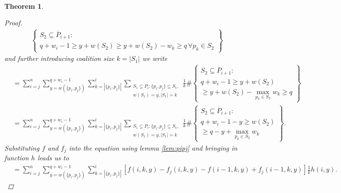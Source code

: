 \documentclass[review]{elsarticle}
\newtheorem{thm}{Theorem} %
\theoremstyle{defn}
\theoremstyle{Pseudo-Code}
\begin{document}
\begin{thm}
\begin{proof}
\begin{align*}
    \left\lbrace
    \substack{
         S_2\subseteq \overline{P}_{i+1}: 
         \\
         q+w_i-1\geq y+ w(S_2)\geq y+w(S_2)-w_k\geq q\, \forall p_k\in S_2 
     }    
    \right\rbrace
\end{align*}
and further introducing coalition size $k=|S_1|$ we write
\begin{align*}
  &=
  \sum_{i=j}^n
  \sum_{y=w(\{ p_i,p_j \})}^{q+w_i-1}
  \sum_{k=|\{ p_i,p_j \}|}^i
  \sum_{\substack{S_1\subseteq P_i: \{p_i, p_j\}\subseteq S_1, 
  \\ w(S_1)=y,|S_1|=k}}
    \frac{1}{k}
    \#\left\lbrace
      \substack{
         S_2\subseteq \overline{P}_{i+1}:
         \\
          q+w_i-1\geq y+w( S_2)
         \\          
          \geq y+w(S_2)-\max\limits_{p_k\in S_2}w_k\geq q    
      }
    \right\rbrace      
\\
  &=
  \sum_{i=j}^n
  \sum_{y=w(\{ p_i,p_j \})}^{q+w_i-1}
  \sum_{k=|\{ p_i,p_j \}|}^i
  \sum_{\substack{S_1\subseteq P_i: \{p_i, p_j\}\subseteq S_1, 
  \\ w(S_1)=y,|S_1|=k}}
    \frac{1}{k}
   \#\left\lbrace
   \substack{
       S_2\subseteq \overline{P}_{i+1}: 
       \\
       q+w_i-1-y\geq w(S_2)
       \\
       \geq q-y+\max\limits_{p_k\in S_2}w_k
    }
    \right\rbrace    
     . 
\end{align*}
Substituting $f$ and $f_j$ into the equation using lemma \ref{lem:pipj} and bringing in function $h$ leads us to
\begin{align*}
  &=
  \sum_{i=j}^n
  \sum_{y=w(\{ p_i,p_j \})}^{q+w_i-1}
  \sum_{k=|\{ p_i,p_j \}|}^i
  \scriptstyle
    \left[
      f(i,k,y)-f_j(i,k,y)
      -f(i-1,k,y)+f_j(i-1,k,y)
    \right]
    \frac{1}{k}
    h(i,y)
    .
\end{align*}
\end{proof}
\end{thm}
\end{document}
